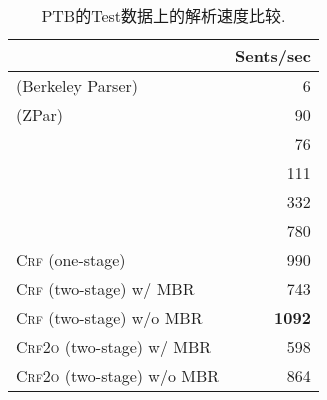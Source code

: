 \begin{table}[tb!]
  \setlength{\tabcolsep}{15pt}
  \centering
  \caption{PTB的Test数据上的解析速度比较.}
  \begin{tabular}{lr}
    \toprule
                                                          & Sents/sec     \\
    \midrule
    \citet{petrov-klein-2007-improved}  (Berkeley Parser) & 6             \\
    \citet{zhu-etal-2013-fast} (ZPar)                     & 90            \\
    \citet{stern-etal-2017-minimal}                       & 76            \\
    \citet{shen-etal-2018-straight}                       & 111           \\
    \citet{kitaev-klein-2018-constituency}                & 332           \\
    \citet{gomez-rodriguez-vilares-2018-constituent}      & 780           \\[3pt]
    \textsc{Crf} (one-stage)                              & 990           \\
    \textsc{Crf} (two-stage) w/ MBR                       & 743           \\
    \textsc{Crf} (two-stage) w/o MBR                      & \textbf{1092} \\
    \textsc{Crf2o} (two-stage) w/ MBR                     & 598           \\
    \textsc{Crf2o} (two-stage) w/o MBR                    & 864           \\

    \bottomrule
  \end{tabular}
  \label{table:speed}
\end{table}